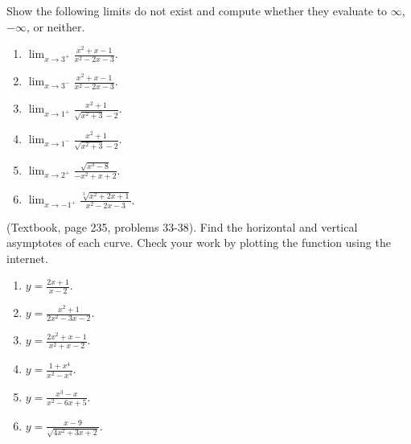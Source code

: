 \begin{problem}
Show the following limits do not exist and compute whether they evaluate to $\infty $, $-\infty$, or neither. 
\begin{multicols}{3}
\begin{enumerate}
\item $\displaystyle\lim_{x\to 3^+} \frac{x^{2}+x-1}{x^2-2x-3} $.
\item $\displaystyle\lim_{x\to 3^-} \frac{x^{2}+x-1}{x^2-2x-3} $.
\item $\displaystyle\lim_{x\to 1^+} \frac{x^2+1}{\sqrt{x^2+3 }-2} $.
\item $\displaystyle\lim_{x\to 1^-} \frac{x^2+1}{\sqrt{x^2+3 }-2} $.
\item $\displaystyle\lim_{x\to 2^+} \frac{\sqrt{x^3-8}}{ -x^2+x+2} $.
\item $\displaystyle\lim_{x\to -1^+} \frac{\sqrt[3]{x^2+2x+1}}{ x^2-2x-3} $.

\end{enumerate}
\end{multicols}
\end{problem}


\begin{problem}(Textbook, page 235, problems 33-38).
Find the horizontal and vertical asymptotes of each curve. Check your work by plotting the function using the internet.
\begin{multicols}{3}
\begin{enumerate}
\item $y=\frac{2x+1}{x-2}$.
\item $y=\frac{x^2+1}{2x^2-3x-2}$.
\item $y=\frac{2x^2+x-1}{x^2+x-2}$.
\item $y=\frac{1+x^4}{x^2-x^4}$.
\item $y=\frac{x^3-x}{x^2-6x+5}$.
\item $y=\frac{x-9}{\sqrt{4x^2+3x+2}}$.
\end{enumerate}
\end{multicols}
\end{problem}

